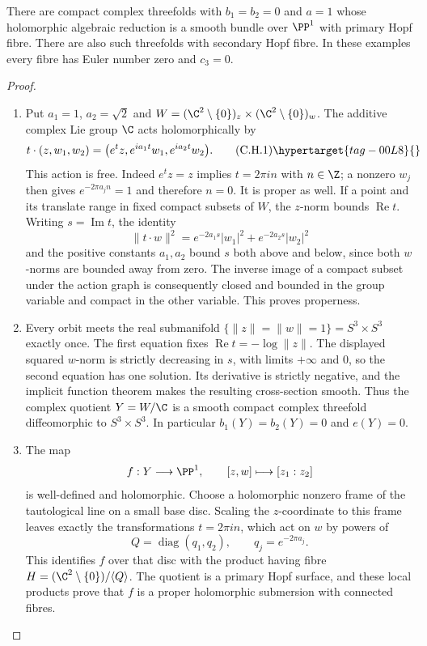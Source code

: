 \begin{proposition}\hypertarget{tag-01FC}{}\label{cdp:st:C.3.6}


There are compact complex threefolds with $b_1=b_2=0$ and $a=1$
whose holomorphic algebraic reduction is a smooth bundle over
$\PP^1$ with primary Hopf fibre. There are also such threefolds
with secondary Hopf fibre. In these examples every fibre has Euler
number zero and $c_3=0$.
\end{proposition}


\begin{proof}

\begin{enumerate}[label={$\langle1\rangle$\arabic*.},leftmargin=*]
\item Put $a_1=1$, $a_2=\sqrt2$ and
$W=(\C^2\setminus\{0\})_z\times(\C^2\setminus\{0\})_w$.
The additive complex Lie group $\C$ acts holomorphically by
\[
t\cdot(z,w_1,w_2)
 =\bigl(e^t z,e^{ia_1t}w_1,e^{ia_2t}w_2\bigr).
\tag{C.H.1}\hypertarget{tag-00L8}{}\label{cdp:eq:C.H.1}
\]
This action is free. Indeed $e^t z=z$ implies $t=2\pi in$ with
$n\in\Z$; a nonzero $w_j$ then gives $e^{-2\pi a_jn}=1$ and
therefore $n=0$. It is proper as well. If a point and its translate
range in fixed compact subsets of $W$, the $z$-norm bounds
$\operatorname{Re}t$. Writing $s=\operatorname{Im}t$, the identity
\[
\|t\cdot w\|^2
 =e^{-2a_1s}|w_1|^2+e^{-2a_2s}|w_2|^2
\]
and the positive constants $a_1,a_2$ bound $s$ both above and
below, since both $w$-norms are bounded away from zero. The inverse
image of a compact subset under the action graph is consequently
closed and bounded in the group variable and compact in the other
variable. This proves properness.

\item Every orbit meets the real submanifold
$\{\|z\|=\|w\|=1\}=S^3\times S^3$ exactly once.
The first equation fixes $\operatorname{Re}t=-\log\|z\|$.
The displayed squared $w$-norm is strictly decreasing in $s$,
with limits $+\infty$ and $0$, so the second equation has one
solution. Its derivative is strictly negative, and the implicit
function theorem makes the resulting cross-section smooth.
Thus the complex quotient $Y=W/\C$ is a smooth compact complex
threefold diffeomorphic to $S^3\times S^3$. In particular
$b_1(Y)=b_2(Y)=0$ and $e(Y)=0$.

\item The map
\[
f:Y\longrightarrow\PP^1,\qquad [z,w]\longmapsto[z_1:z_2]
\]
is well-defined and holomorphic. Choose a holomorphic nonzero
frame of the tautological line on a small base disc. Scaling the
$z$-coordinate to this frame leaves exactly the transformations
$t=2\pi in$, which act on $w$ by powers of
\[
Q=\operatorname{diag}(q_1,q_2),\qquad
q_j=e^{-2\pi a_j}.
\]
This identifies $f$ over that disc with the product having fibre
$H=(\C^2\setminus\{0\})/\langle Q\rangle$.
The quotient is a primary Hopf surface, and these local products
prove that $f$ is a proper holomorphic submersion with connected
fibres.


\end{enumerate}
\end{proof}
